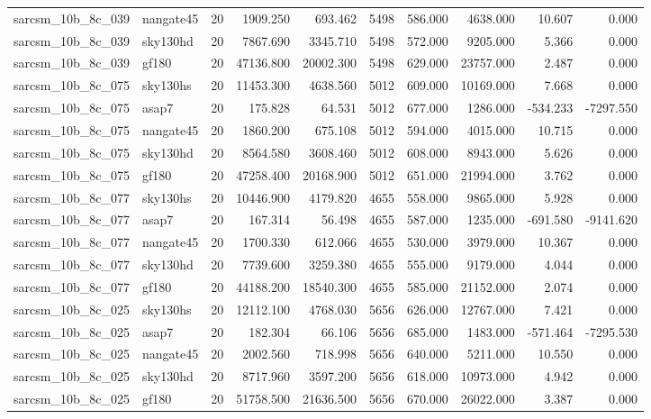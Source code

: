 \documentclass{article}
\begin{document}
\begin{longtable}{llrrrrrrrr}
sarcsm\_10b\_8c\_039 & nangate45 & 20 & 1909.250 & 693.462 & 5498 & 586.000 & 4638.000 & 10.607 & 0.000 \\
sarcsm\_10b\_8c\_039 & sky130hd & 20 & 7867.690 & 3345.710 & 5498 & 572.000 & 9205.000 & 5.366 & 0.000 \\
sarcsm\_10b\_8c\_039 & gf180 & 20 & 47136.800 & 20002.300 & 5498 & 629.000 & 23757.000 & 2.487 & 0.000 \\
sarcsm\_10b\_8c\_075 & sky130hs & 20 & 11453.300 & 4638.560 & 5012 & 609.000 & 10169.000 & 7.668 & 0.000 \\
sarcsm\_10b\_8c\_075 & asap7 & 20 & 175.828 & 64.531 & 5012 & 677.000 & 1286.000 & -534.233 & -7297.550 \\
sarcsm\_10b\_8c\_075 & nangate45 & 20 & 1860.200 & 675.108 & 5012 & 594.000 & 4015.000 & 10.715 & 0.000 \\
sarcsm\_10b\_8c\_075 & sky130hd & 20 & 8564.580 & 3608.460 & 5012 & 608.000 & 8943.000 & 5.626 & 0.000 \\
sarcsm\_10b\_8c\_075 & gf180 & 20 & 47258.400 & 20168.900 & 5012 & 651.000 & 21994.000 & 3.762 & 0.000 \\
sarcsm\_10b\_8c\_077 & sky130hs & 20 & 10446.900 & 4179.820 & 4655 & 558.000 & 9865.000 & 5.928 & 0.000 \\
sarcsm\_10b\_8c\_077 & asap7 & 20 & 167.314 & 56.498 & 4655 & 587.000 & 1235.000 & -691.580 & -9141.620 \\
sarcsm\_10b\_8c\_077 & nangate45 & 20 & 1700.330 & 612.066 & 4655 & 530.000 & 3979.000 & 10.367 & 0.000 \\
sarcsm\_10b\_8c\_077 & sky130hd & 20 & 7739.600 & 3259.380 & 4655 & 555.000 & 9179.000 & 4.044 & 0.000 \\
sarcsm\_10b\_8c\_077 & gf180 & 20 & 44188.200 & 18540.300 & 4655 & 585.000 & 21152.000 & 2.074 & 0.000 \\
sarcsm\_10b\_8c\_025 & sky130hs & 20 & 12112.100 & 4768.030 & 5656 & 626.000 & 12767.000 & 7.421 & 0.000 \\
sarcsm\_10b\_8c\_025 & asap7 & 20 & 182.304 & 66.106 & 5656 & 685.000 & 1483.000 & -571.464 & -7295.530 \\
sarcsm\_10b\_8c\_025 & nangate45 & 20 & 2002.560 & 718.998 & 5656 & 640.000 & 5211.000 & 10.550 & 0.000 \\
sarcsm\_10b\_8c\_025 & sky130hd & 20 & 8717.960 & 3597.200 & 5656 & 618.000 & 10973.000 & 4.942 & 0.000 \\
sarcsm\_10b\_8c\_025 & gf180 & 20 & 51758.500 & 21636.500 & 5656 & 670.000 & 26022.000 & 3.387 & 0.000 \\

\end{longtable}
\end{document}
